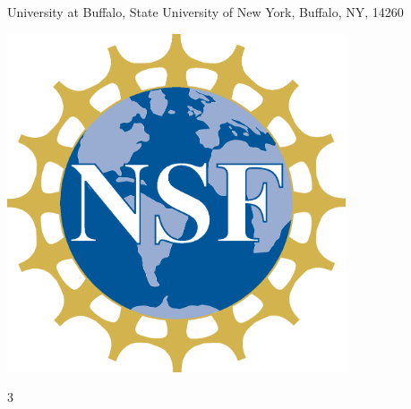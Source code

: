 \documentclass[landscape,a0b,final]{a0poster}
\newenvironment{poster}{
  \begin{center}
  \begin{minipage}[c]{0.981\textwidth}
}{
  \end{minipage} 
  \end{center}
}
\newenvironment{pcolumn}[1]{
  \begin{minipage}{#1\textwidth}
  \begin{center}
}{
  \end{center}
  \end{minipage}
}
\begin{document}
\begin{poster}
\begin{center}
\begin{pcolumn}{0.98}
{\begin{minipage}[c][9cm][c]{0.75\textwidth}
\begin{center}
{        \hspace{5cm}
        University at Buffalo, State University of New York, Buffalo, NY, 14260}
    \end{center}
    \end{minipage}
    \begin{minipage}[c][9cm][c]{0.01\linewidth}
    \begin{flushright}
        \hspace*{5cm}
        \includegraphics[width=10cm,angle=0]{figures/nsf4}
    \end{flushright}
    \end{minipage}
}
\end{pcolumn}
\end{center}

\vspace*{0.05cm} %


\begin{multicols}{3}


\end{multicols}
\end{poster}
\end{document}
